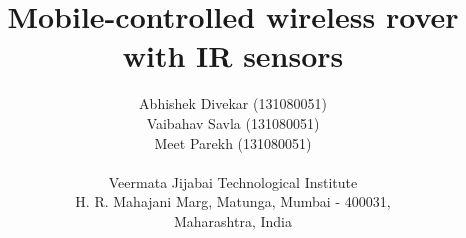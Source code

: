 \documentclass[a4paper, 12pt, onecolumn]{article}
\begin{document}
	
	


	




%
%
%


	

%
%


\title{Mobile-controlled wireless rover with IR sensors}

\author{
	Abhishek Divekar (131080051) \\ 
	Vaibahav Savla (131080051) \\ 
	Meet Parekh (131080051) \\ 
	\\
	Veermata Jijabai Technological Institute\\
	H. R. Mahajani Marg, Matunga, Mumbai - 400031,\\ 
	Maharashtra, India\\
}
\end{document}
